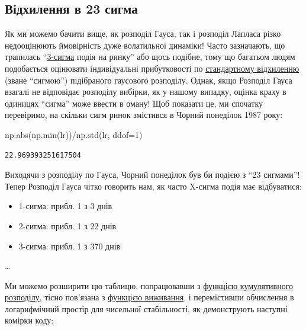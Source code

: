 \documentclass[
  letterpaper,
]{report}
\newenvironment{Shaded}{\begin{snugshade}}{\end{snugshade}}
\newcommand{\BuiltInTok}[1]{\textcolor[rgb]{0.00,0.23,0.31}{#1}}
\newcommand{\DecValTok}[1]{\textcolor[rgb]{0.68,0.00,0.00}{#1}}
\newcommand{\NormalTok}[1]{\textcolor[rgb]{0.00,0.23,0.31}{#1}}
\newcommand{\OperatorTok}[1]{\textcolor[rgb]{0.37,0.37,0.37}{#1}}
\providecommand{\tightlist}{%
  \setlength{\itemsep}{0pt}\setlength{\parskip}{0pt}}\usepackage{longtable,booktabs,array}
\begin{document}
\hypertarget{ux432ux456ux434ux445ux438ux43bux435ux43dux43dux44f-ux432-23-ux441ux438ux433ux43cux430}{%
\subsection{Відхилення в 23
сигма}\label{ux432ux456ux434ux445ux438ux43bux435ux43dux43dux44f-ux432-23-ux441ux438ux433ux43cux430}}

Як ми можемо бачити вище, як розподіл Гауса, так і розподіл Лапласа
різко недооцінюють ймовірність дуже волатильної динаміки! Часто
зазначають, що трапилась
``\href{https://en.wikipedia.org/wiki/68\%E2\%80\%9395\%E2\%80\%9399.7_rule}{3-сигма}
подія на ринку'' або щось подібне, тому що багатьом людям подобається
оцінювати індивідуальні прибутковості по
\href{https://en.wikipedia.org/wiki/Standard_deviation}{стандартному
відхиленню} (зване ``сигмою'') підібраного гаусового розподілу. Однак,
якщо Розподіл Гауса взагалі не відповідає розподілу вибірки, як у нашому
випадку, оцінка краху в одиницях ``сигма'' може ввести в оману! Щоб
показати це, ми спочатку перевіримо, на скільки сигм ринок змістився в
Чорний понеділок 1987 року:

\begin{Shaded}
\begin{Highlighting}[]
\NormalTok{np.}\BuiltInTok{abs}\NormalTok{(np.}\BuiltInTok{min}\NormalTok{(lr))}\OperatorTok{/}\NormalTok{np.std(lr, ddof}\OperatorTok{=}\DecValTok{1}\NormalTok{)}
\end{Highlighting}
\end{Shaded}

\begin{verbatim}
22.969393251617504
\end{verbatim}

Виходячи з розподілу по Гауса, Чорний понеділок був би подією з ``23
сигмами''! Тепер Розподіл Гауса чітко говорить нам, як часто X-сигма
подія має відбуватися:

\begin{itemize}
\tightlist
\item
  1-сигма: прибл. 1 з 3 днів
\item
  2-сигма: прибл. 1 з 22 днів
\item
  3-сигма: прибл. 1 з 370 днів
\end{itemize}

\ldots{}

Ми можемо розширити цю таблицю, попрацювавши з
\href{https://en.wikipedia.org/wiki/Cumulative_distribution_function}{функцією
кумулятивного розподілу}, тісно пов'язана з
\href{https://en.wikipedia.org/wiki/Survival_function}{функцією
виживання}, і перемістивши обчислення в логарифмічний простір для
чисельної стабільності, як демонструють наступні комірки коду:
\end{document}
